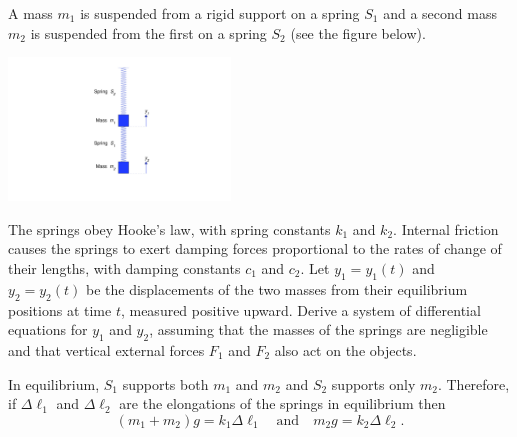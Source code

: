 \documentclass{ximera}
\begin{document}
\begin{example}\label{example:10.1.2}
A mass $m_1$ is suspended from a rigid support on a spring $S_1$ and a
second mass $m_2$ is suspended from the first on a spring $S_2$
(see the figure below). 

\begin{image}
 \includegraphics[height=1.5in]{fig100102.jpg} 
\end{image}

The springs obey Hooke's law, with spring
constants $k_1$ and $k_2$. Internal friction causes the springs to
exert damping forces proportional to the rates of change of their
lengths, with damping constants $c_1$ and $c_2$. Let $y_1=y_1(t)$ and
$y_2=y_2(t)$ be the displacements of the two masses from their
equilibrium positions at time $t$, measured positive upward.
 Derive a system of differential equations
for $y_1$ and $y_2$, assuming that the masses of the springs are
negligible and that vertical external forces $F_1$ and $F_2$ also act
on the objects.


\begin{explanation}
In equilibrium, $S_1$ supports both $m_1$ and $m_2$ and $S_2$ supports
only $m_2$. Therefore, if $\Delta\ell_1$ and $\Delta\ell_2$ are the
elongations of the springs in equilibrium then
\begin{equation} \label{eq:10.1.7}
(m_1+m_2)g=k_1\Delta\ell_1\quad\mbox{and}\quad m_2g=k_2\Delta\ell_2.
\end{equation}


\end{explanation}
\end{example}
\end{document}
